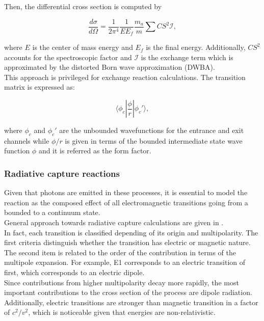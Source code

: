 \documentclass[openany]{book}
\begin{document}
Then, the differential cross section is computed by 

\begin{equation} \label{eq:exchange_differential}
	\frac{d\sigma}{d\Omega} = \frac{1}{2\pi^4} \frac{1}{E E_f} \frac{m_a}{m} \sum {CS^2 \mathcal{I} } ,
\end{equation}

where $E$ is the center of mass energy and $E_f$ is the final energy. Additionally, $CS^2$ accounts for the spectroscopic factor and $\mathcal{I}$ is the exchange term which is approximated by the distorted Born wave approximation (DWBA). \\

This approach is privileged for exchange reaction calculations. The transition matrix is expressed as: 

\begin{equation}\label{eq:exchange_matrix}
	\langle  \phi_c | \frac{\phi}{r}|  \phi_c' \rangle,
\end{equation}

where $\phi_c $ and $\phi_c'$ are the unbounded wavefunctions for the entrance and exit channels while $\phi/r$ is given in terms of the bounded intermediate state wave function $\phi$ and it is referred as the form factor. 
 
\subsubsection{Radiative capture reactions}   \label{ssub:potential_calculations_radiativeCapture}

Given that photons are emitted in these processes, it is essential to model the reaction as the composed effect of  all electromagnetic transitions going from a bounded to a continuum state.  \\

General approach towards radiative capture calculations are given in \cite{goldhaber_weneser_1955}.\\

In fact, each transition is classified depending of its origin and multipolarity. The first criteria distinguish whether the transition has electric or magnetic nature. The second item is related to the order of the contribution in terms of the multipole expansion. For example, E1 corresponds to an electric transition of first, which corresponds to an electric dipole. \\

Since contributions from higher multipolarity decay more rapidly, the most important contributions to the cross section of the process are dipole radiation. Additionally, electric transitions are stronger than magnetic transition in a factor of $c^2/v^2$, which is noticeable given that energies are non-relativistic.
\end{document}

